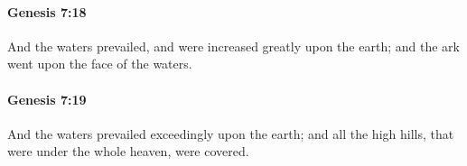 		\paragraph{Genesis 7:18} %
			\label{GENESIS-7-18}

			And the waters prevailed, and were increased greatly upon the earth; and the ark went upon the face of the waters.


		\paragraph{Genesis 7:19} %
			\label{GENESIS-7-19}

			And the waters prevailed exceedingly upon the earth; and all the high hills, that were under the whole heaven, were covered.


